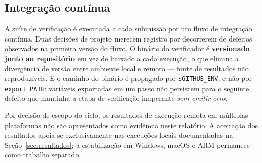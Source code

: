 \subsection{Integração contínua}

A suíte de verificação é executada a cada submissão por um fluxo de integração contínua. Duas
decisões de projeto merecem registro por decorrerem de defeitos observados na primeira versão
do fluxo. O binário do verificador é \textbf{versionado junto ao repositório} em vez de
baixado a cada execução, o que elimina a divergência de versão entre ambiente local e remoto
--- fonte de resultados não reproduzíveis. E o caminho do binário é propagado por
\texttt{\$GITHUB\_ENV}, e não por \texttt{export PATH}: variáveis exportadas em um passo não
persistem para o seguinte, defeito que mantinha a etapa de verificação inoperante \emph{sem
emitir erro}.

Por decisão de escopo do ciclo, os resultados de execução remota em múltiplas plataformas
não são apresentados como evidência neste relatório. A aceitação dos resultados apoia-se
exclusivamente nas execuções locais documentadas na Seção~\ref{sec:resultados}; a
estabilização em Windows, macOS e ARM permanece como trabalho separado.
